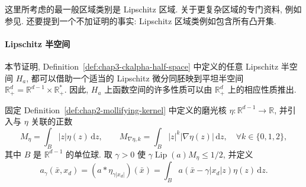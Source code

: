 这里所考虑的最一般区域类别是 Lipschitz 区域. 关于更复杂区域的专门资料, 例如参见. 还要提到一个不加证明的事实: Lipschitz 区域类例如包含所有凸开集.

\paragraph{Lipschitz 半空间}

本节证明, Definition~\ref{def:chap3-ckalpha-half-space} 中定义的任意 Lipschitz 半空间 $H_a$, 都可以借助一个适当的 Lipschitz 微分同胚映到平坦半空间 $\mathbb R_+^d=\mathbb R^{d-1}\times\mathbb R_+^*$. 因此, $H_a$ 上函数空间的许多性质可以由 $\mathbb R_+^d$ 上的相应性质推出.

固定 Definition~\ref{def:chap2-mollifying-kernel} 中定义的磨光核 $\eta:\mathbb{R}^{d-1}\to\mathbb{R}$, 并引入与 $\eta$ 关联的正数
\[
 M_\eta=\int_B|z|\eta(z)\,\mathrm{d}z,
 \qquad M_{\nabla\eta,k}=\int_B|z|^k|\nabla\eta(z)|\,\mathrm{d}z,
 \quad\forall k\in\{0,1,2\},
\]
其中 $B$ 是 $\mathbb R^{d-1}$ 的单位球.
取 $\gamma>0$ 使 $\gamma\operatorname{Lip}(a)M_\eta\leq1/2$, 并定义
\begin{equation}
 a_\gamma(\bar x,x_d)
 =(a*\eta_{\gamma|x_d|})(\bar x)
 =\int_Ba(\bar x-\gamma|x_d|z)\eta(z)\,\mathrm{d}z.
 \label{eq:chap3-regularized-graph}
\end{equation}

